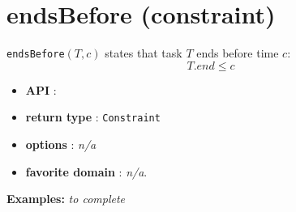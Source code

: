 \section{endsBefore (constraint)}\label{endsbefore:endsbeforeconstraint}\hypertarget{endsbefore:endsbeforeconstraint}{}
\begin{notedef}
  \texttt{endsBefore}$(T,c)$ states that task $T$ ends before time $c$:
  $$T.end \le c$$
\end{notedef}

\begin{itemize}
	\item \textbf{API} :
	\item \textbf{return type} : \texttt{Constraint}
	\item \textbf{options} : \emph{n/a}
	\item \textbf{favorite domain} : \emph{n/a}.
\end{itemize}

\textbf{Examples:}
%
\emph{to complete}

